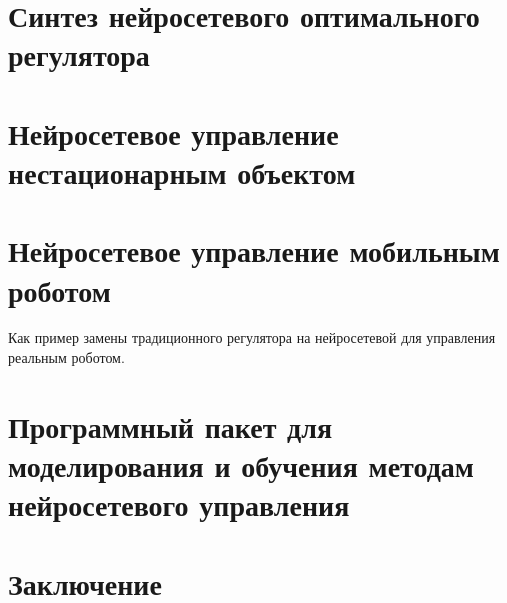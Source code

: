 \documentclass[12pt]{rusthesis}
\begin{document}
\chapter{Синтез нейросетевого оптимального регулятора}
%

\chapter{Нейросетевое управление нестационарным объектом}


\chapter{Нейросетевое управление мобильным роботом}
Как пример замены традиционного регулятора на нейросетевой для
управления реальным роботом.
%

\chapter{Программный пакет для моделирования и обучения методам нейросетевого управления}


\chapter*{Заключение}




%

%
\end{document}
